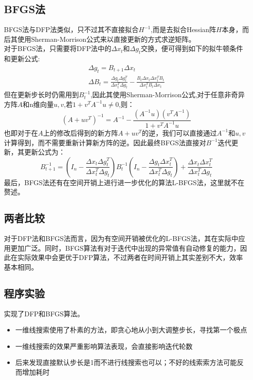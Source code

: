\documentclass{SCIS2020cn}
\begin{document}
\subsection{BFGS法 }
BFGS法与DFP法类似，只不过其不直接拟合$H^{-1}$,而是去拟合Hessian阵$H$本身，而后其使用Sherman-Morrison公式来以直接更新的方式求逆矩阵。\\
对于BFGS法，只需要将DFP法中的$\Delta x_t$和$\Delta g_t$交换，便可得到如下的拟牛顿条件和更新公式:
\begin{eqnarray}
    \Delta g_t=B_{t+1}\Delta x_t\\
    \Delta B_t=\frac{\Delta g_t\Delta g_t^T}{\Delta x_t^T\Delta g_t}-\frac{B_t\Delta x_t\Delta x_t^TB_t}{\Delta x_t^TB_t\Delta x_t}
\end{eqnarray}
但在更新步长时仍需用到$B^{-1}_t$,因此其使用Sherman-Morrison公式,对于任意非奇异方阵$A$和n维向量$u,v$,若$1+v^TA^{-1}u\neq 0$,则：
\begin{equation}
    (A+uv^T)^{-1}=A^{-1}-\frac{(A^{-1}u)(v^TA^{-1})}{1+v^TA^{-1}u}
\end{equation}
也即对于在$A$上的修改后得到的新方阵$A+uv^T$的逆，我们可以直接通过$A^{-1}$和$u,v$计算得到，而不需要重新计算新方阵的逆。因此最终BFGS法直接对$B^{-1}$迭代更新，其更新公式为：
\begin{equation}
    B_{t+1}^{-1}=\left(I_n-\frac{\Delta x_t\Delta g_t^T}{\Delta x_t^T\Delta g_t}\right)B_t^{-1}\left(I_n-\frac{\Delta g_t\Delta x_t^T}{\Delta x_t^T\Delta g_t}\right)+\frac{\Delta x_t\Delta x_t^T}{\Delta x_t^T\Delta g_t}
\end{equation}
最后，BFGS法还有在空间开销上进行进一步优化的算法L-BFGS法，这里就不在赘述。
\subsection{两者比较}
对于DFP法和BFGS法而言，因为有空间开销被优化的L-BFGS法，其在实际中应用更加广泛。同时，BFGS算法有对于迭代中出现的异常值有自动修复的能力\cite{5}，因此在实际效果中会更优于DFP算法，不过两者在时间开销上其实差别不大，效率基本相同\cite{4}。

\subsection{程序实验}
实现了DFP和BFGS算法。
\begin{itemize}
    \item 一维线搜索使用了朴素的方法，即贪心地从小到大调整步长，寻找第一个极点
    \item 一维线搜索的效果严重影响算法表现，会直接影响迭代轮数
    \item 后来发现直接默认步长是1而不进行线搜索也可以；不好的线索索方法可能反而增加耗时
\end{itemize}
\end{document}

